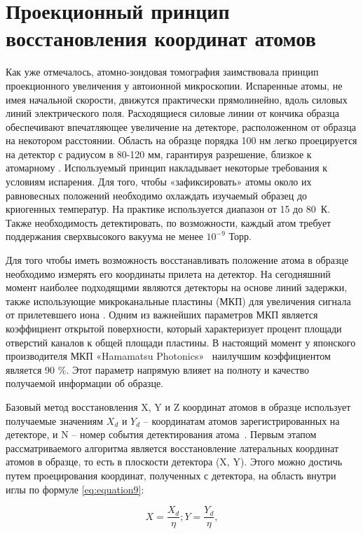 \FloatBarrier

\section{Проекционный принцип восстановления координат атомов}\label{sec:ch1/sec3}

Как уже отмечалось, атомно-зондовая томография заимствовала принцип проекционного увеличения у автоионной микроскопии. Испаренные атомы, не имея начальной скорости,  движутся практически прямолинейно, вдоль силовых линий электрического поля. Расходящиеся силовые линии от кончика образца обеспечивают впечатляющее увеличение на детекторе, расположенном от образца на некотором расстоянии. Область на образце порядка 100 нм легко проецируется на детектор с радиусом в 80-120 мм, гарантируя разрешение, близкое к атомарному \cite{Cadel09}. Используемый принцип накладывает некоторые требования к условиям испарения. Для того, чтобы «зафиксировать» атомы около их равновесных положений необходимо охлаждать изучаемый образец до криогенных температур. На практике используется диапазон от 15 до 80~К. Также необходимость детектировать, по возможности, каждый атом требует поддержания сверхвысокого вакуума не менее $10^{-9}$ Торр.

Для того чтобы иметь возможность восстанавливать положение атома в образце необходимо измерять его координаты прилета на детектор. На сегодняшний момент наиболее подходящими являются детекторы на основе линий задержки, также использующие микроканальные пластины (МКП) для увеличения сигнала от прилетевшего иона \cite{DaCosta05,Jagutzki05}. Одним из важнейших параметров МКП является коэффициент открытой поверхности, который характеризует процент площади отверстий каналов к общей площади пластины. В настоящий момент у японского производителя МКП «Hamamatsu Photonics»~\cite{Hamamatsu} наилучшим коэффициентом является 90 $\%$. Этот параметр напрямую влияет на полноту и качество получаемой информации об образце.

Базовый метод восстановления X, Y и Z координат атомов в образце использует получаемые значениям $X_d$ и $Y_d$ – координатам атомов зарегистрированных на детекторе, и N – номер события детектирования атома~\cite{Bas95}. Первым этапом рассматриваемого алгоритма является восстановление латеральных координат атомов в образце, то есть в плоскости детектора (X, Y). Этого можно достичь путем проецирования координат, полученных с детектора, на область внутри иглы по формуле \cref{eq:equation9}:

\begin{equation}
	\label{eq:equation9}
	X = \frac{X_d}{\eta}; Y = \frac{Y_d}{\eta},
\end{equation} 

